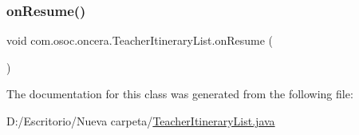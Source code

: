 \mbox{\label{classcom_1_1osoc_1_1oncera_1_1_teacher_itinerary_list_a1c7491a73b1826b4f899ceae5713057a}} 
\subsubsection{\texorpdfstring{onResume()}{onResume()}}
{\footnotesize\ttfamily void com.\+osoc.\+oncera.\+Teacher\+Itinerary\+List.\+on\+Resume (\begin{DoxyParamCaption}{ }\end{DoxyParamCaption})\hspace{0.3cm}{\ttfamily [protected]}}



The documentation for this class was generated from the following file\+:\begin{DoxyCompactItemize}
\item 
D\+:/\+Escritorio/\+Nueva carpeta/\mbox{\hyperlink{_teacher_itinerary_list_8java}{Teacher\+Itinerary\+List.\+java}}\end{DoxyCompactItemize}
